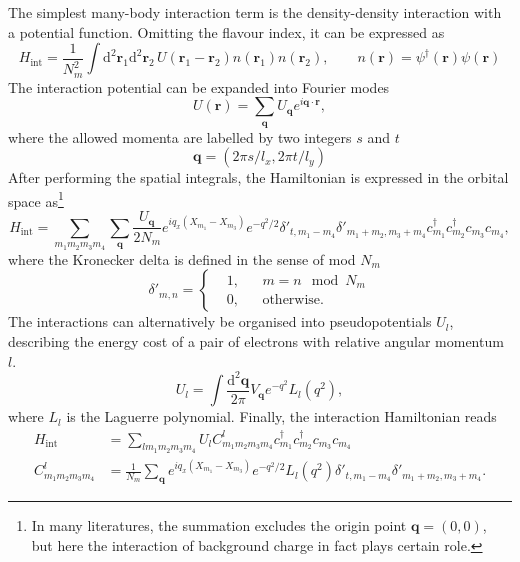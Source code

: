 \documentclass{timesjhep}
\begin{document}
The simplest many-body interaction term is the density-density interaction with a potential function. Omitting the flavour index, it can be expressed as
\begin{equation}
    H_\textrm{int}=\frac{1}{N_m^2}\int\mathrm{d}^2\mathbf{r}_1\mathrm{d}^2\mathbf{r}_2\,U(\mathbf{r}_1-\mathbf{r}_2)n(\mathbf{r}_1)n(\mathbf{r}_2),\qquad n(\mathbf{r})=\psi^\dagger(\mathbf{r})\psi(\mathbf{r})
\end{equation}
The interaction potential can be expanded into Fourier modes
\begin{equation}
    U(\mathbf{r})=\sum_\mathbf{q}U_\mathbf{q}e^{i\mathbf{q}\cdot\mathbf{r}},
\end{equation}
where the allowed momenta are labelled by two integers $s$ and $t$
\begin{equation}
    \mathbf{q}=(2\pi s/l_x,2\pi t/l_y)
\end{equation}
After performing the spatial integrals, the Hamiltonian is expressed in the orbital space as\footnote{In many literatures, the summation excludes the origin point $\mathbf{q}=(0,0)$, but here the interaction of background charge in fact plays certain role.}
\begin{equation}
    H_\textrm{int}=\sum_{m_1m_2m_3m_4}\sum_\mathbf{q}\frac{U_\mathbf{q}}{2N_m}e^{iq_x(X_{m_1}-X_{m_3})}e^{-q^2/2}\delta'_{t,m_1-m_4}\delta'_{m_1+m_2,m_3+m_4}c^\dagger_{m_1}c^\dagger_{m_2}c_{m_3}c_{m_4},
\end{equation}
where the Kronecker delta is defined in the sense of mod $N_m$
\begin{equation*}
    \delta'_{m,n}=\left\{\begin{aligned}
        &1,&&m=n\mod N_m\\
        &0,&&\textrm{otherwise.}
    \end{aligned}\right.
\end{equation*}
The interactions can alternatively be organised into pseudopotentials $U_l$, describing the energy cost of a pair of electrons with relative angular momentum $l$.
\begin{equation}
    U_l=\int\frac{\mathrm{d}^2\mathbf{q}}{2\pi}V_\mathbf{q}e^{-q^2}L_l(q^2),
\end{equation}
where $L_l$ is the Laguerre polynomial. Finally, the interaction Hamiltonian reads
\begin{align}
    H_\textrm{int}&=\sum_{lm_1m_2m_3m_4}U_lC_{m_1m_2m_3m_4}^l c^\dagger_{m_1}c^\dagger_{m_2}c_{m_3}c_{m_4}\nonumber\\
    C_{m_1m_2m_3m_4}^l&=\frac{1}{N_m}\sum_\textbf{q}e^{iq_x(X_{m_1}-X_{m_3})}e^{-q^2/2}L_l(q^2)\delta'_{t,m_1-m_4}\delta'_{m_1+m_2,m_3+m_4}.
\end{align}
\end{document}
